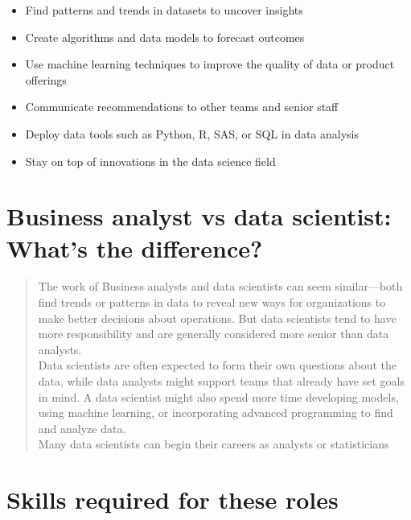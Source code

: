 \documentclass[
]{book}
\providecommand{\tightlist}{%
  \setlength{\itemsep}{0pt}\setlength{\parskip}{0pt}}
\begin{document}
\begin{itemize}
\tightlist
\item
  Find patterns and trends in datasets to uncover insights
\item
  Create algorithms and data models to forecast outcomes
\item
  Use machine learning techniques to improve the quality of data or product offerings
\item
  Communicate recommendations to other teams and senior staff
\item
  Deploy data tools such as Python, R, SAS, or SQL in data analysis
\item
  Stay on top of innovations in the data science field
\end{itemize}

\hypertarget{business-analyst-vs-data-scientist-whats-the-difference}{%
\section*{Business analyst vs data scientist: What's the difference?}\label{business-analyst-vs-data-scientist-whats-the-difference}}

\begin{quote}
The work of Business analysts and data scientists can seem similar---both find trends or patterns in data to reveal new ways for organizations to make better decisions about operations. But data scientists tend to have more responsibility and are generally considered more senior than data analysts.\\
Data scientists are often expected to form their own questions about the data, while data analysts might support teams that already have set goals in mind. A data scientist might also spend more time developing models, using machine learning, or incorporating advanced programming to find and analyze data.\\
Many data scientists can begin their careers as analysts or statisticians
\end{quote}

\hypertarget{skills-required-for-these-roles}{%
\section*{Skills required for these roles}\label{skills-required-for-these-roles}}
\end{document}
